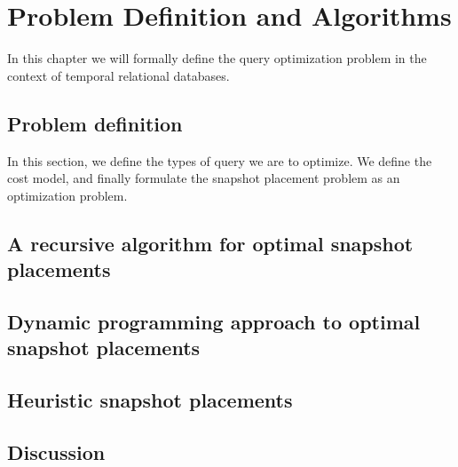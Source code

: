 \chapter{Problem Definition and Algorithms}

In this chapter we will formally define the query optimization problem in the
context of temporal relational databases.

\section{Problem definition}

In this section, we define the types of query we are to optimize.  We define the
cost model, and finally formulate the snapshot placement problem as an
optimization problem.

\section{A recursive algorithm for optimal snapshot placements}

\section{Dynamic programming approach to optimal snapshot placements}

\section{Heuristic snapshot placements}

\section{Discussion}
